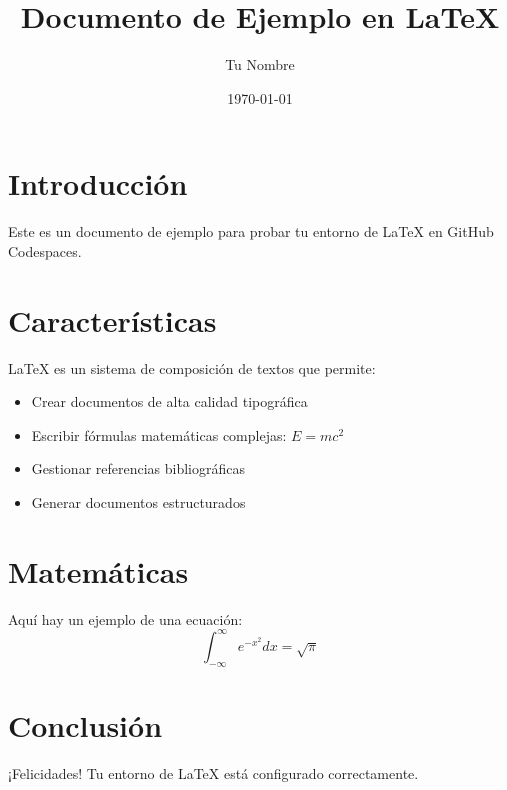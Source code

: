 \documentclass{article}
\title{Documento de Ejemplo en LaTeX}
\author{Tu Nombre}
\date{\today}
\begin{document}
\maketitle

\section{Introducción}
Este es un documento de ejemplo para probar tu entorno de LaTeX en GitHub Codespaces.

\section{Características}
LaTeX es un sistema de composición de textos que permite:
\begin{itemize}
    \item Crear documentos de alta calidad tipográfica
    \item Escribir fórmulas matemáticas complejas: $E = mc^2$
    \item Gestionar referencias bibliográficas
    \item Generar documentos estructurados
\end{itemize}

\section{Matemáticas}
Aquí hay un ejemplo de una ecuación:
\begin{equation}
    \int_{-\infty}^{\infty} e^{-x^2} dx = \sqrt{\pi}
\end{equation}

\section{Conclusión}
¡Felicidades! Tu entorno de LaTeX está configurado correctamente.
\end{document}
